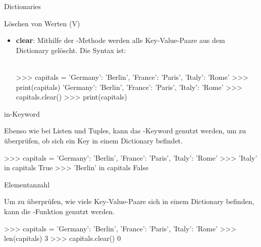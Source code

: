 \begin{subsection}{Dictionaries}
        \begin{frame}[fragile]{Löschen von Werten (V)}
        
            \begin{itemize}
                \item \textbf{clear}: Mithilfe der -Methode werden alle Key-Value-Paare aus dem Dictionary gelöscht. Die Syntax ist: \\~\
                
                
\begin{pyconcode}
>>> capitals = {'Germany': 'Berlin', 'France': 'Paris', 'Italy': 'Rome'}
>>> print(capitals)
{'Germany': 'Berlin', 'France': 'Paris', 'Italy': 'Rome'}
>>> capitals.clear()
>>> print(capitals)
{}
\end{pyconcode}  
            \end{itemize}
                
        \end{frame}
        
        \begin{frame}[fragile]{in-Keyword}
        
            Ebenso wie bei Listen und Tuples, kann das -Keyword genutzt werden, um zu überprüfen, ob sich ein Key in einem Dictionary befindet.
                
\begin{pyconcode}
>>> capitals = {'Germany': 'Berlin', 'France': 'Paris', 'Italy': 'Rome'}
>>> 'Italy' in capitals
True
>>> 'Berlin' in capitals
False
\end{pyconcode}  
        
                
        \end{frame}
        
        \begin{frame}[fragile]{Elementanzahl}
        
            Um zu überprüfen, wie viele Key-Value-Paare sich in einem Dictionary befinden, kann die -Funktion genutzt werden.
                
\begin{pyconcode}
>>> capitals = {'Germany': 'Berlin', 'France': 'Paris', 'Italy': 'Rome'}
>>> len(capitals)
3
>>> capitals.clear()
0
\end{pyconcode}  
        
                
        \end{frame}
        

\end{subsection}
